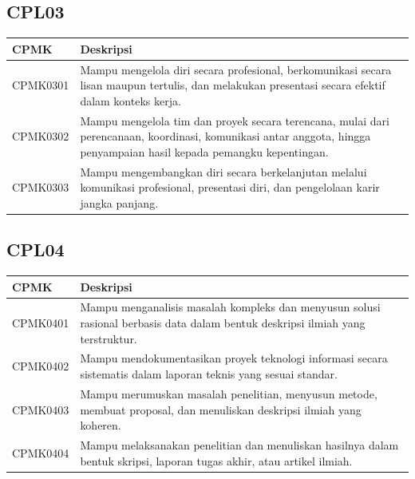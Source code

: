 \subsection{CPL03}
\begin{longtable}{L{2cm}L{12cm}}
\toprule
CPMK & Deskripsi \\
\midrule
\endhead
CPMK0301 & Mampu mengelola diri secara profesional, berkomunikasi secara lisan maupun tertulis, dan melakukan presentasi secara efektif dalam konteks kerja. \\
CPMK0302 & Mampu mengelola tim dan proyek secara terencana, mulai dari perencanaan, koordinasi, komunikasi antar anggota, hingga penyampaian hasil kepada pemangku kepentingan. \\
CPMK0303 & Mampu mengembangkan diri secara berkelanjutan melalui komunikasi profesional, presentasi diri, dan pengelolaan karir jangka panjang. \\
\bottomrule
\end{longtable}

\subsection{CPL04}
\begin{longtable}{L{2cm}L{12cm}}
\toprule
CPMK & Deskripsi \\
\midrule
\endhead
CPMK0401 & Mampu menganalisis masalah kompleks dan menyusun solusi rasional berbasis data dalam bentuk deskripsi ilmiah yang terstruktur. \\
CPMK0402 & Mampu mendokumentasikan proyek teknologi informasi secara sistematis dalam laporan teknis yang sesuai standar. \\
CPMK0403 & Mampu merumuskan masalah penelitian, menyusun metode, membuat proposal, dan menuliskan deskripsi ilmiah yang koheren. \\
CPMK0404 & Mampu melaksanakan penelitian dan menuliskan hasilnya dalam bentuk skripsi, laporan tugas akhir, atau artikel ilmiah. \\
\bottomrule
\end{longtable}

